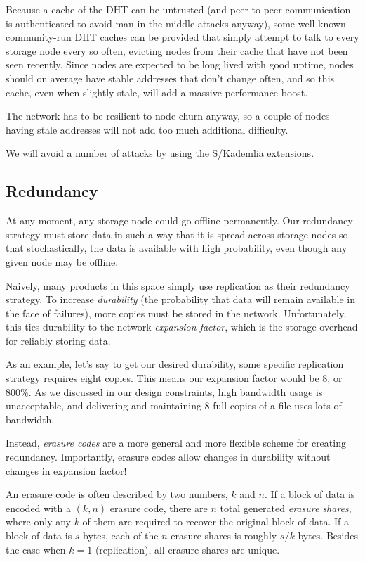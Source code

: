 \documentclass[a4paper,10pt]{article}
\begin{document}
Because a cache of the DHT can be untrusted (and peer-to-peer
communication is authenticated to avoid man-in-the-middle-attacks anyway),
some well-known community-run DHT caches can be provided that simply attempt to
talk to every storage node every so often, evicting nodes from their cache that
have not been seen recently. Since nodes are expected to be long lived with
good uptime, nodes should on average have stable addresses that don't change
often, and so this cache, even when slightly stale, will add a massive
performance boost.

The network has to be resilient to node churn anyway, so a couple of nodes
having stale addresses will not add too much additional difficulty.

We will avoid a number of attacks by using the S/Kademlia\cite{skad}
extensions.

\subsection{Redundancy}

At any moment, any storage node could go offline permanently. Our redundancy
strategy must store data in such a way that it is spread across storage nodes
so that stochastically, the data is available with high probability, even though
any given node may be offline.

Naively, many products in this space simply use replication as their redundancy
strategy. To increase {\em durability} (the probability that data will remain
available in the face of failures), more copies must be stored in the network.
Unfortunately, this ties durability to the network {\em expansion factor}, which
is the storage overhead for reliably storing data.

As an example, let's say to get our desired durability, some specific
replication strategy requires eight copies. This means our expansion factor
would be 8, or 800\%.
As we discussed in our design constraints, high bandwidth usage is unacceptable,
and delivering and maintaining 8 full copies of a file uses lots of bandwidth.

Instead, {\em erasure codes} are a more general and more flexible scheme for
creating redundancy. Importantly, erasure codes allow changes in durability
without changes in expansion factor!

An erasure code is often described by two numbers, $k$ and $n$. If a block of
data is encoded with a $(k,n)$ erasure code, there are $n$ total generated
{\em erasure shares}, where only any $k$ of them are required to recover the
original block of data. If a block of data is $s$ bytes, each of the $n$
erasure shares is roughly $s/k$ bytes. Besides the case when $k=1$
(replication), all erasure shares are unique.
\end{document}
